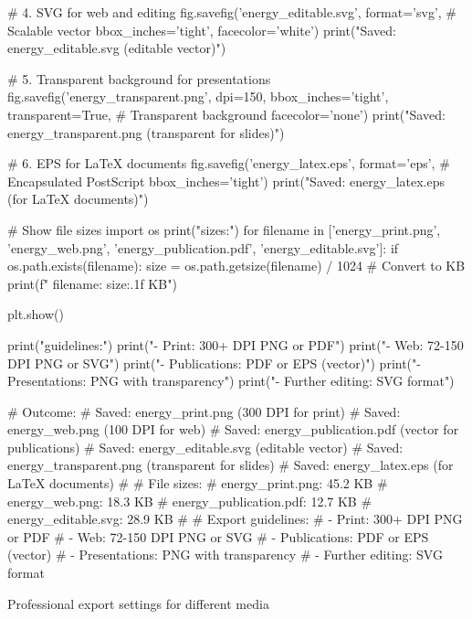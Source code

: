 {    # 4. SVG for web and editing
    fig.savefig('energy_editable.svg',
               format='svg',               # Scalable vector
               bbox_inches='tight',
               facecolor='white')
    print("Saved: energy_editable.svg (editable vector)")
    
    # 5. Transparent background for presentations
    fig.savefig('energy_transparent.png',
               dpi=150,
               bbox_inches='tight',
               transparent=True,           # Transparent background
               facecolor='none')
    print("Saved: energy_transparent.png (transparent for slides)")
    
    # 6. EPS for LaTeX documents
    fig.savefig('energy_latex.eps',
               format='eps',               # Encapsulated PostScript
               bbox_inches='tight')
    print("Saved: energy_latex.eps (for LaTeX documents)")
    
    # Show file sizes
    import os
    print("\nFile sizes:")
    for filename in ['energy_print.png', 'energy_web.png', 
                     'energy_publication.pdf', 'energy_editable.svg']:
        if os.path.exists(filename):
            size = os.path.getsize(filename) / 1024  # Convert to KB
            print(f"  {filename}: {size:.1f} KB")
    
    plt.show()
    
    print("\nExport guidelines:")
    print("- Print: 300+ DPI PNG or PDF")
    print("- Web: 72-150 DPI PNG or SVG")
    print("- Publications: PDF or EPS (vector)")
    print("- Presentations: PNG with transparency")
    print("- Further editing: SVG format")
    
    # Outcome:
    # Saved: energy_print.png (300 DPI for print)
    # Saved: energy_web.png (100 DPI for web)
    # Saved: energy_publication.pdf (vector for publications)
    # Saved: energy_editable.svg (editable vector)
    # Saved: energy_transparent.png (transparent for slides)
    # Saved: energy_latex.eps (for LaTeX documents)
    # 
    # File sizes:
    #   energy_print.png: 45.2 KB
    #   energy_web.png: 18.3 KB
    #   energy_publication.pdf: 12.7 KB
    #   energy_editable.svg: 28.9 KB
    # 
    # Export guidelines:
    # - Print: 300+ DPI PNG or PDF
    # - Web: 72-150 DPI PNG or SVG
    # - Publications: PDF or EPS (vector)
    # - Presentations: PNG with transparency
    # - Further editing: SVG format
}{Professional export settings for different media}


